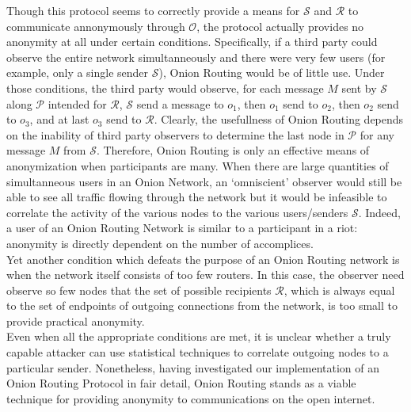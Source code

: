 \documentclass[10pt]{report}
\begin{document}
Though this protocol seems to correctly provide a means for $\mathcal{S}$ and $\mathcal{R}$ to communicate
annonymously through $\mathcal{O}$, the protocol actually provides no anonymity at all under certain conditions.
Specifically, if a third party could observe the entire network simultanneously and there were very few users
(for example, only a single sender $\mathcal{S}$), Onion Routing would be of little use.  Under those conditions,
the third party would observe, for each message $M$ sent by $\mathcal{S}$ along $\mathcal{P}$ intended for
$\mathcal{R}$, $\mathcal{S}$ send a message to $o_1$, then $o_1$ send to $o_2$, then $o_2$ send to $o_3$, and
at last $o_3$ send to $\mathcal{R}$.  Clearly, the usefullness of Onion Routing depends on the inability of
third party observers to determine the last node in $\mathcal{P}$ for any message $M$ from $\mathcal{S}$.
Therefore, Onion Routing is only an effective means of anonymization when participants are many.  When there are
large quantities of simultanneous users in an Onion Network, an `omniscient' observer would still be able
to see all traffic flowing through the network but it would be infeasible to correlate the activity of the
various nodes to the various users/senders $\mathcal{S}$.  Indeed, a user of an Onion Routing Network is similar
to a participant in a riot: anonymity is directly dependent on the number of accomplices.\\

Yet another condition which defeats the purpose of an Onion Routing network is when the network itself consists
of too few routers.  In this case, the observer need observe so few nodes that the set of possible recipients
$\mathcal{R}$, which is always equal to the set of endpoints of outgoing connections from the network, is too
small to provide practical anonymity.\\

Even when all the appropriate conditions are met, it is unclear whether a truly capable attacker can use
statistical techniques to correlate outgoing nodes to a particular sender.  Nonetheless, having investigated
our implementation of an Onion Routing Protocol in fair detail, Onion Routing stands as a viable technique for
providing anonymity to communications on the open internet.
\end{document}

